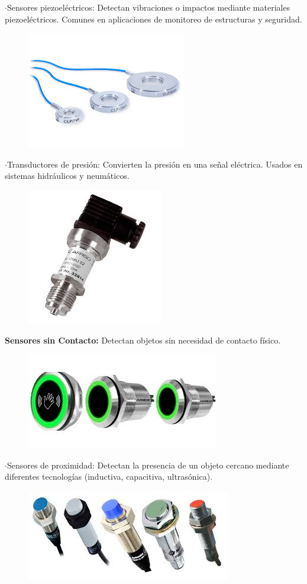 	
	$\cdot$Sensores piezoeléctricos: Detectan vibraciones o impactos mediante materiales piezoeléctricos. Comunes en aplicaciones de monitoreo de estructuras y seguridad.


\begin{figure} [h]
	\centering
	\includegraphics[width=0.3\linewidth]{img/sensorespiezoelectrico}
	\caption{}
	\label{fig:sensorespiezoelectrico}
\end{figure}

\newpage
	$\cdot$Transductores de presión: Convierten la presión en una señal eléctrica. Usados en sistemas hidráulicos y neumáticos.
	
	
\begin{figure} [h]
	\centering
	\includegraphics[width=0.3\linewidth]{img/transductordepresion}
	\caption{}
	\label{fig:transductordepresion}
\end{figure}
	
	
\textbf{Sensores sin Contacto:}
	Detectan objetos sin necesidad de contacto físico.
	
		
\begin{figure} [h]
	\centering
	\includegraphics[width=0.3\linewidth]{img/sensoressincontacto}
	\caption{}
	\label{fig:sensoressincontacto}
\end{figure}
	
	
	$\cdot$Sensores de proximidad: Detectan la presencia de un objeto cercano mediante diferentes tecnologías (inductiva, capacitiva, ultrasónica).
	
		
\begin{figure} [h]
	\centering
	\includegraphics[width=0.3\linewidth]{img/sensoresdeproximidad}
	\caption{}
	\label{fig:sensoresdeproximidad}
\end{figure}

